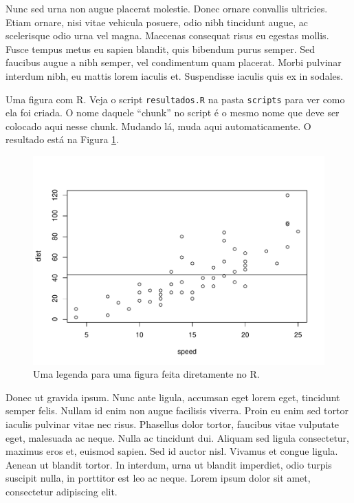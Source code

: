 \documentclass[book,A4paper,10pt,twoside,oldfontcommands]{memoir}\usepackage[]{graphicx}\usepackage[usenames,dvipsnames]{color}
\newenvironment{knitrout}{}{} %
\begin{document}
\begin{btUnit}
\begin{knitrout}
\end{knitrout}

Nunc sed urna non augue placerat molestie. Donec ornare convallis
ultricies. Etiam ornare, nisi vitae vehicula posuere, odio nibh
tincidunt augue, ac scelerisque odio urna vel magna. Maecenas
consequat risus eu egestas mollis. Fusce tempus metus eu sapien
blandit, quis bibendum purus semper. Sed faucibus augue a nibh semper,
vel condimentum quam placerat. Morbi pulvinar interdum nibh, eu mattis
lorem iaculis et. Suspendisse iaculis quis ex in sodales.

Uma figura com R. Veja o script \texttt{resultados.R} na pasta
\texttt{scripts} para ver como ela foi criada. O nome daquele ``chunk''
no script é o mesmo nome que deve ser colocado aqui nesse chunk. Mudando
lá, muda aqui automaticamente. O resultado está na Figura
\ref{fig:xyplot}.

\begin{knitrout}
\color{fgcolor}\begin{figure}[!htb]

{\centering \includegraphics[width=0.8\linewidth]{figuras/cap01/cap01-xyplot-1} 

}

\caption[Uma legenda para uma figura feita diretamente no R]{Uma legenda para uma figura feita diretamente no R.}\label{fig:xyplot}
\end{figure}


\end{knitrout}

Donec ut gravida ipsum. Nunc ante ligula, accumsan eget lorem eget,
tincidunt semper felis. Nullam id enim non augue facilisis viverra.
Proin eu enim sed tortor iaculis pulvinar vitae nec risus. Phasellus
dolor tortor, faucibus vitae vulputate eget, malesuada ac neque. Nulla
ac tincidunt dui. Aliquam sed ligula consectetur, maximus eros et,
euismod sapien. Sed id auctor nisl. Vivamus et congue ligula. Aenean
ut blandit tortor. In interdum, urna ut blandit imperdiet, odio turpis
suscipit nulla, in porttitor est leo ac neque. Lorem ipsum dolor sit
amet, consectetur adipiscing elit.


\end{btUnit}
\end{document}
